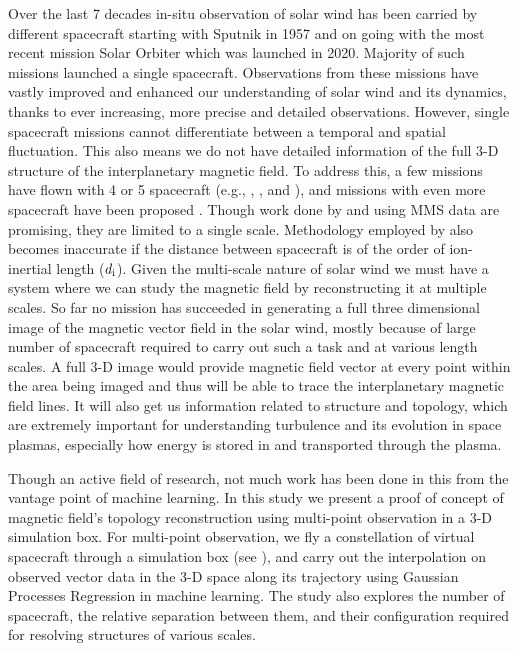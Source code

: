         Over the last 7 decades in-situ observation of solar wind has been carried by different
        spacecraft starting with Sputnik in 1957 and on going with the most recent mission Solar
        Orbiter which was launched in 2020. Majority of such missions launched a single spacecraft.
        Observations from these missions have vastly improved and enhanced our understanding of
        solar wind and its dynamics, thanks to ever increasing, more precise and detailed
        observations. However, single spacecraft missions cannot differentiate between a temporal
        and spatial fluctuation. This also means we do not have detailed information of the full 3-D
        structure of the interplanetary magnetic field. To address this, a few missions have flown
        with 4 or 5 spacecraft (e.g.,
        ,
        , and
        ), and
        missions with even more spacecraft have been proposed \citep{Klein2019a}. Though work done
        by \citet{Fu2015} and \citet{Torbert2020} using MMS data are promising, they are limited to
        a single scale. Methodology employed by \citet{Fu2015} also becomes inaccurate if the
        distance between spacecraft is of the order of ion-inertial length ($d_{\rm i}$). Given the
        multi-scale nature of solar wind \citep{Verscharen2019} we must have a system where we can
        study the magnetic field by reconstructing it at multiple scales. So far no mission has
        succeeded in generating a full three dimensional image of the magnetic vector field in the
        solar wind, mostly because of large number of spacecraft required to carry out such a task
        and at various length scales. A full 3-D image would provide magnetic field vector at every
        point within the area being imaged and thus will be able to trace the interplanetary
        magnetic field lines. It will also get us information related to structure and topology,
        which are extremely important for understanding turbulence and its evolution in space
        plasmas, especially how energy is stored in and transported through the plasma.

        Though an active field of research, not much work has been done in this from the vantage
        point of machine learning. In this study we present a proof of concept of magnetic field’s
        topology reconstruction using multi-point observation in a 3-D simulation box. For
        multi-point observation, we fly a constellation of virtual spacecraft through a simulation
        box (see ), and carry out the interpolation on observed vector data in the
        3-D space along its trajectory using Gaussian Processes Regression in machine learning. The
        study also explores the number of spacecraft, the relative separation between them, and
        their configuration required for resolving structures of various scales.

